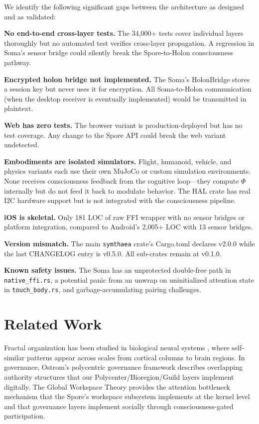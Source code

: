 \documentclass[11pt,twocolumn]{article}
\begin{document}
We identify the following significant gaps between the architecture as designed and as validated:

\textbf{No end-to-end cross-layer tests.} The 34,000+ tests cover individual layers thoroughly but no automated test verifies cross-layer propagation. A regression in Soma's sensor bridge could silently break the Spore-to-Holon consciousness pathway.

\textbf{Encrypted holon bridge not implemented.} The Soma's HolonBridge stores a session key but never uses it for encryption. All Soma-to-Holon communication (when the desktop receiver is eventually implemented) would be transmitted in plaintext.

\textbf{Web has zero tests.} The browser variant is production-deployed but has no test coverage. Any change to the Spore API could break the web variant undetected.

\textbf{Embodiments are isolated simulators.} Flight, humanoid, vehicle, and physics variants each use their own MuJoCo or custom simulation environments. None receives consciousness feedback from the cognitive loop---they compute $\Phi$ internally but do not feed it back to modulate behavior. The HAL crate has real I2C hardware support but is not integrated with the consciousness pipeline.

\textbf{iOS is skeletal.} Only 181 LOC of raw FFI wrapper with no sensor bridges or platform integration, compared to Android's 2,005+ LOC with 13 sensor bridges.

\textbf{Version mismatch.} The main \texttt{symthaea} crate's Cargo.toml declares v2.0.0 while the last CHANGELOG entry is v0.5.0. All sub-crates remain at v0.1.0.

\textbf{Known safety issues.} The Soma has an unprotected double-free path in \texttt{native\_ffi.rs}, a potential panic from an unwrap on uninitialized attention state in \texttt{touch\_body.rs}, and garbage-accumulating pairing challenges.

\section{Related Work}
\label{sec:related}

Fractal organization has been studied in biological neural systems \cite{werner2010}, where self-similar patterns appear across scales from cortical columns to brain regions. In governance, Ostrom's polycentric governance framework \cite{ostrom1990} describes overlapping authority structures that our Polycenter/Bioregion/Guild layers implement digitally. The Global Workspace Theory \cite{baars1988} provides the attention bottleneck mechanism that the Spore's workspace subsystem implements at the kernel level and that governance layers implement socially through consciousness-gated participation.
\end{document}
